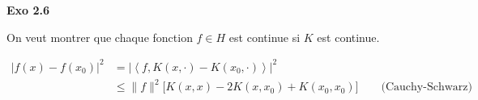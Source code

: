 \documentclass[11pt]{article}
\begin{document}
    \begin{comment}
    
    \vspace{-4em}
    $$\rho (r) = \cfrac{1}{1 + r^2} = \int e^{-t(r^2 + 1)} dt$$
    \vspace{-4em}

    En prenant $t = u^2$, on a:

    \vspace{-2em}
    $$\rho (r) = \int e^{-u^2(r^2 + 1)} d(u^2) = \int e^{-u^2 r^2} d(-e^{-u^2})$$
    \vspace{-4em}

    $\mu(u) = -e^{-u^2}$ est une mesure borélinenne positive finie sur $\mathbb{R_+}$, donc $\rho(r)$ définit un noyau positif.

      Tout d'abord, on montre que le noyau est défini negatif. Un noyau est dit défini negatif si il est symmétrique et pour tout $\{x_1, \cdots, x_m\} \in \mathcal{X}$, $c \in \mathbb{R}^{m \times 1}$ et $1^T c = 0$, on a $c^T K c = 0$

    Prenons $c$ tel que $\sum_{i=1}^m c_i = 0$:

    \vspace{-4em}
    \begin{align*}
      \sum_{i,j = 1}^m \|x_i - x_j\|^2 c_i c_j &= \sum_{i,j = 1}^m (x_i - x_j) \cdot (x_i - x_j) c_i c_j \\
      &= \sum_{i,j = 1}^m (\|x_i\|^2 + \|x_j\|^2 - 2 x_i \cdot x_j) c_i c_j \\
      &= \sum_{i,j = 1}^m \Big (\|x_i\|^2 + \|x_j\|^2 \Big )c_i c_j - 2 \sum_{i=1}^m c_i x_i \cdot \sum_{j=1}^m c_j x_j \\
      &\le \sum_{i,j = 1}^m \Big (\|x_i\|^2 + \|x_j\|^2 \Big )c_i c_j \\
      &= \sum_{j=1}^m c_j \Big (\sum_{i=1}^m c_i \|x_i\|^2) + \sum_{i=1}^m c_i \Big (\sum_{j=1}^m c_j \|x_j\|^2) \\
      &= 0
    \end{align*}
    \vspace{-4em}

    Donc $\|x_i-x_j\|^2$ est un noyau défini negatif. 
    \end{comment}
    


    \textbf{Exo 2.6}

    On veut montrer que chaque fonction $f \in H$ est continue si $K$ est continue.

    \vspace{-4em}
    \begin{align*}
      |f(x) - f(x_0)|^2 &= | \left \langle f, K(x, \cdot) - K(x_0, \cdot) \right \rangle |^2 \\
      &\le \|f\|^2 \big[K(x, x) - 2 K(x, x_0) + K(x_0, x_0) \big] \qquad \mbox{(Cauchy-Schwarz)}
    \end{align*}
    \vspace{-4em}
\end{document}
